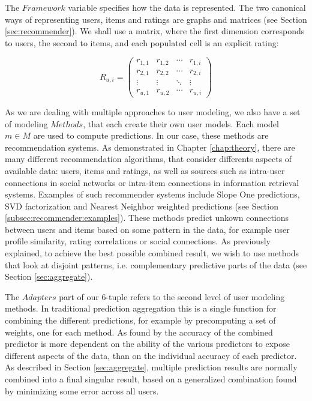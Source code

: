 The $Framework$ variable specifies how the data is represented.
The two canonical ways of representing users, items and ratings are graphs and matrices (see Section \ref{sec:recommender}).
We shall use a matrix, where the first dimension corresponds to users, the second to items, and each populated cell is an explicit rating:

\begin{equation*}
 R_{u,i} =
 \begin{pmatrix}
  r_{1,1} & r_{1,2} & \cdots & r_{1,i} \\
  r_{2,1} & r_{2,2} & \cdots & r_{2,i} \\
  \vdots  & \vdots  & \ddots & \vdots  \\
  r_{u,1} & r_{u,2} & \cdots & r_{u,i}
 \end{pmatrix}
\end{equation*}

As we are dealing with multiple approaches to user modeling, we also have a set of modeling $Methods$, that each create their own
user models. 
Each model $m \in M$ are used to compute predictions.
In our case, these methods are recommendation systems.
As demonstrated in Chapter \ref{chap:theory}, there are many different recommendation algorithms,
that consider differents aspects of available data: users, items and ratings, as well as 
sources such as intra-user connections in social networks or intra-item connections in information retrieval systems.
Examples of such recommender systems include Slope One predictions, SVD factorization and Nearest Neighbor weighted predictions
(see Section \ref{subsec:recommender:examples}).
These methods predict unkown connections between users and items based on some pattern in the data,
for example user profile similarity, rating correlations or social connections.
As previously explained, to achieve the best possible combined result, we wish to use methods that look at disjoint patterns, 
i.e. complementary predictive parts of the data (see Section \ref{sec:aggregate}).

The $Adapters$ part of our 6-tuple refers to the second level of user modeling methods.
In traditional prediction aggregation this is a single function for combining the different predictions,
for example by precomputing a set of weights, one for each method.
As found by \citet[p6]{Bell2007} the accuracy of the combined predictor is more dependent on the 
ability of the various predictors to expose different aspects of the data, than on 
the individual accuracy of each predictor.
As described in Section \ref{sec:aggregate}, multiple prediction results are normally 
combined into a final singular result,
based on a generalized combination found by minimizing some error across all users.

